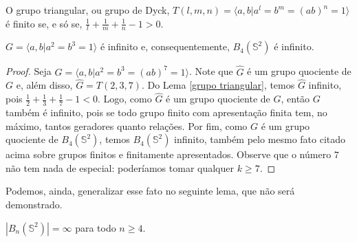 	\begin{lemma}
		\label{grupo triangular}
		O grupo triangular, ou grupo de Dyck, $T(l,m,n) = \langle a,b|a^l=b^m=(ab)^n=1 \rangle$ é finito se, e só se, $\displaystyle{\frac{1}{l} + \frac{1}{m} + \frac{1}{n} - 1 > 0}$.
	\end{lemma}
	
	
	\begin{prop}
		\label{quociente de B4(S2) infinito}
		$G = \langle a,b|a^2=b^3=1 \rangle$ é infinito e, consequentemente, $B_4(\mathbb{S}^2)$ é infinito.
	\end{prop}
	
	\begin{proof}
		Seja $\widehat{G} = \langle a,b|a^2=b^3=(ab)^7=1 \rangle$. Note que $\widehat{G}$ é um grupo quociente de $G$ e, além disso, $\widehat{G} = T(2,3,7)$. Do Lema \eqref{grupo triangular}, temos $\widehat{G}$ infinito, pois $\displaystyle{\frac{1}{2} + \frac{1}{3} + \frac{1}{7} - 1 < 0}$. Logo, como $\widehat{G}$ é um grupo quociente de $G$, então $G$ também é infinito, pois se todo grupo finito com apresentação finita tem, no máximo, tantos geradores quanto relações. Por fim, como $G$ é um grupo quociente de $B_4(\mathbb{S}^2)$, temos $B_4(\mathbb{S}^2)$ infinito, também pelo mesmo fato citado acima sobre grupos finitos e finitamente apresentados. Observe que o número $7$ não tem nada de especial: poderíamos tomar qualquer $k\geq 7$.
	\end{proof}
	
	\par\vspace{0.3cm} Podemos, ainda, generalizar esse fato no seguinte lema, que não será demonstrado.
	
	\begin{lemma}
		\label{grupo de trancas esfericas infinitos}
		$|B_n(\mathbb{S}^2)| = \infty$ para todo $n\geq 4$.
	\end{lemma}
	
